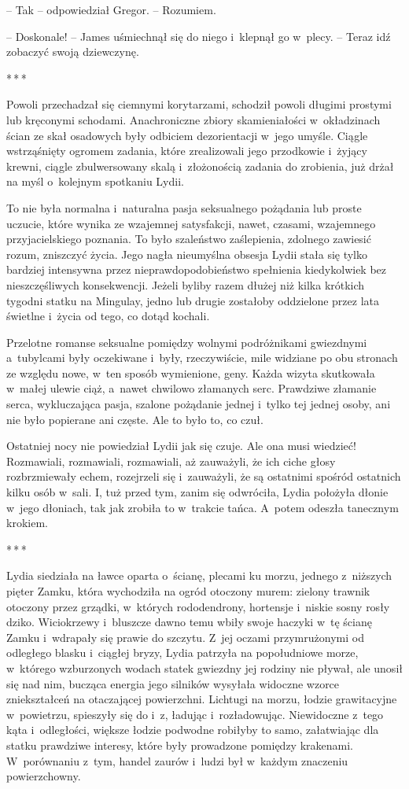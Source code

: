\documentclass[oneside,polish,12pt,sfheadings]{mwbk}
\newcommand{\threeast}{\bigskip\par\centerline{*\,*\,*}\medskip\par}%
\begin{document}
-- Tak -- odpowiedział Gregor. -- Rozumiem.

-- Doskonale! -- James uśmiechnął się do niego i~klepnął go w~plecy. --
Teraz idź zobaczyć swoją dziewczynę.

\threeast

Powoli przechadzał się ciemnymi korytarzami, schodził powoli długimi
prostymi lub kręconymi schodami. Anachroniczne zbiory skamieniałości w~okładzinach ścian ze skał osadowych były odbiciem dezorientacji w~jego
umyśle. Ciągle wstrząśnięty ogromem zadania, które zrealizowali jego
przodkowie i~żyjący krewni, ciągle zbulwersowany skalą i~złożonością
zadania do zrobienia, już drżał na myśl o~kolejnym spotkaniu Lydii.

To nie była normalna i~naturalna pasja seksualnego pożądania lub proste
uczucie, które wynika ze wzajemnej satysfakcji, nawet, czasami,
wzajemnego przyjacielskiego poznania. To było szaleństwo zaślepienia,
zdolnego zawiesić rozum, zniszczyć życia. Jego nagła nieumyślna obsesja
Lydii stała się tylko bardziej intensywna przez nieprawdopodobieństwo
spełnienia kiedykolwiek bez nieszczęśliwych konsekwencji. Jeżeli byliby
razem dłużej niż kilka krótkich tygodni statku na Mingulay, jedno lub
drugie zostałoby oddzielone przez lata świetlne i~życia od tego, co
dotąd kochali.

Przelotne romanse seksualne pomiędzy wolnymi podróżnikami gwiezdnymi a~tubylcami były oczekiwane i~były, rzeczywiście, mile widziane po obu
stronach ze względu nowe, w~ten sposób wymienione, geny. Każda wizyta
skutkowała w~małej ulewie ciąż, a~nawet chwilowo złamanych serc.
Prawdziwe złamanie serca, wykluczająca pasja, szalone pożądanie jednej i~tylko tej jednej osoby, ani nie było popierane ani częste. Ale to było
to, co czuł.

Ostatniej nocy nie powiedział Lydii jak się czuje. Ale ona musi
wiedzieć! Rozmawiali, rozmawiali, rozmawiali, aż zauważyli, że ich ciche
głosy rozbrzmiewały echem, rozejrzeli się i~zauważyli, że są ostatnimi
spośród ostatnich kilku osób w~sali. I, tuż przed tym, zanim się
odwróciła, Lydia położyła dłonie w~jego dłoniach, tak jak zrobiła to w~trakcie tańca. A~potem odeszła tanecznym krokiem.

\threeast

Lydia siedziała na ławce oparta o~ścianę, plecami ku morzu, jednego z~niższych pięter Zamku, która wychodziła na ogród otoczony murem: zielony
trawnik otoczony przez grządki, w~których rododendrony, hortensje i~niskie sosny rosły dziko. Wiciokrzewy i~bluszcze dawno temu wbiły swoje
haczyki w~tę ścianę Zamku i~wdrapały się prawie do szczytu. Z~jej oczami
przymrużonymi od odległego blasku i~ciągłej bryzy, Lydia patrzyła na
popołudniowe morze, w~którego wzburzonych wodach statek gwiezdny jej
rodziny nie pływał, ale unosił się nad nim, bucząca energia jego
silników wysyłała widoczne wzorce zniekształceń na otaczającej
powierzchni. Lichtugi na morzu, łodzie grawitacyjne w~powietrzu,
spieszyły się do i~z, ładując i~rozładowując. Niewidoczne z~tego kąta i~odległości, większe łodzie podwodne robiłyby to samo, załatwiając dla
statku prawdziwe interesy, które były prowadzone pomiędzy krakenami. W~porównaniu z~tym, handel zaurów i~ludzi był w~każdym znaczeniu
powierzchowny.
\end{document}
